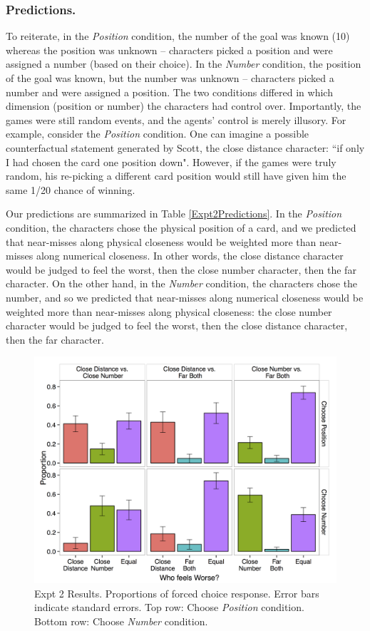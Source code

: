 \documentclass[10pt,letterpaper]{article}
\begin{document}
\subsubsection{Predictions.}
	To reiterate, in the \textit{Position} condition, the number of the goal was known (10) whereas the position was unknown -- characters picked a position and were assigned a number (based on their choice). In the \textit{Number} condition, the position of the goal was known, but the number was unknown -- characters picked a number and were assigned a position. The two conditions differed in which dimension (position or number) the characters had control over. Importantly, the games were still random events, and the agents' control is merely illusory. For example, consider the \textit{Position} condition. One can imagine a possible counterfactual statement generated by Scott, the close distance character: ``if only I had chosen the card one position down". However, if the games were truly random, his re-picking a different card position would still have given him the same 1/20 chance of winning.

	Our predictions are summarized in Table \ref{Expt2Predictions}. In the \textit{Position} condition, the characters chose the physical position of a card, and we predicted that near-misses along physical closeness would be weighted more than near-misses along numerical closeness. In other words, the close distance character would be judged to feel the worst, then the close number character, then the far character. On the other hand, in the \textit{Number} condition, the characters chose the number, and so we predicted that near-misses along numerical closeness would be weighted more than near-misses along physical closeness: the close number character would be judged to feel the worst, then the close distance character, then the far character.



\begin{figure}[htb!]
\includegraphics[width=\columnwidth]{images/cardCombined_forcedWorse.png}
\caption{ Expt 2 Results. Proportions of forced choice response. Error bars indicate standard errors. Top row: Choose \textit{Position} condition. Bottom row: Choose \textit{Number} condition.}
\label{Expt2ResultFig}
\end{figure}
\end{document}
